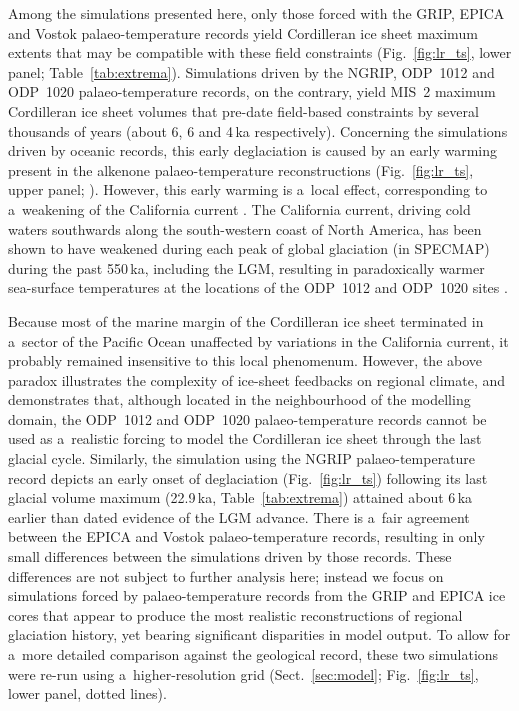 \documentclass[tc, manuscript]{copernicus}
\begin{document}
      Among the simulations presented here, only those forced with the GRIP,
      EPICA and Vostok palaeo-temperature records yield Cordilleran ice
      sheet maximum extents that may be compatible with these field
      constraints (Fig.~\ref{fig:lr_ts}, lower panel;
      Table~\ref{tab:extrema}). Simulations driven by the NGRIP, ODP~1012
      and ODP~1020 palaeo-temperature records, on the contrary, yield MIS~2
      maximum Cordilleran ice sheet volumes that pre-date field-based
      constraints by several thousands of years (about 6, 6 and 4\,\unit{ka}
      respectively). Concerning the simulations driven by oceanic records,
      this early deglaciation is caused by an early warming present in the
      alkenone palaeo-temperature reconstructions (Fig.~\ref{fig:lr_ts},
      upper panel; \citealp[Fig.~3]{Herbert.etal.2001}). However, this early
      warming is a~local effect, corresponding to a~weakening of the
      California current \citep{Herbert.etal.2001}. The California current,
      driving cold waters southwards along the south-western coast of North
      America, has been shown to have weakened during each peak of global
      glaciation (in SPECMAP) during the past 550\,\unit{ka}, including the
      LGM, resulting in paradoxically warmer sea-surface temperatures at the
      locations of the ODP~1012 and ODP~1020 sites
      \citep{Herbert.etal.2001}.

      Because most of the marine margin of the Cordilleran ice sheet
      terminated in a~sector of the Pacific Ocean unaffected by variations
      in the California current, it probably remained insensitive to this
      local phenomenum. However, the above paradox illustrates the
      complexity of ice-sheet feedbacks on regional climate, and
      demonstrates that, although located in the neighbourhood of the
      modelling domain, the ODP~1012 and ODP~1020 palaeo-temperature records
      cannot be used as a~realistic forcing to model the Cordilleran ice
      sheet through the last glacial cycle. Similarly, the simulation using
      the NGRIP palaeo-temperature record depicts an early onset of
      deglaciation (Fig.~\ref{fig:lr_ts}) following its last glacial volume
      maximum (22.9\,\unit{ka}, Table~\ref{tab:extrema}) attained about
      6\,\unit{ka} earlier than dated evidence of the LGM advance. There is
      a~fair agreement between the EPICA and Vostok palaeo-temperature
      records, resulting in only small differences between the simulations
      driven by those records. These differences are not subject to further
      analysis here; instead we focus on simulations forced by
      palaeo-temperature records from the GRIP and EPICA ice cores that
      appear to produce the most realistic reconstructions of regional
      glaciation history, yet bearing significant disparities in model
      output. To allow for a~more detailed comparison against the geological
      record, these two simulations were re-run using a~higher-resolution
      grid (Sect.~\ref{sec:model}; Fig.~\ref{fig:lr_ts}, lower panel, dotted
      lines).
\end{document}
